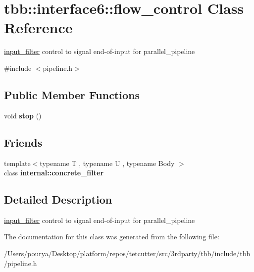 \hypertarget{classtbb_1_1interface6_1_1flow__control}{}\section{tbb\+:\+:interface6\+:\+:flow\+\_\+control Class Reference}
\label{classtbb_1_1interface6_1_1flow__control}


\hyperlink{classinput__filter}{input\+\_\+filter} control to signal end-\/of-\/input for parallel\+\_\+pipeline  




{\ttfamily \#include $<$pipeline.\+h$>$}

\subsection*{Public Member Functions}
\begin{DoxyCompactItemize}
\item 
\hypertarget{classtbb_1_1interface6_1_1flow__control_a21a61b812ca97a6eb5549dab4b4ae490}{}void {\bfseries stop} ()\label{classtbb_1_1interface6_1_1flow__control_a21a61b812ca97a6eb5549dab4b4ae490}

\end{DoxyCompactItemize}
\subsection*{Friends}
\begin{DoxyCompactItemize}
\item 
\hypertarget{classtbb_1_1interface6_1_1flow__control_ae4743f434cefacb6650e3e736daf9392}{}{\footnotesize template$<$typename T , typename U , typename Body $>$ }\\class {\bfseries internal\+::concrete\+\_\+filter}\label{classtbb_1_1interface6_1_1flow__control_ae4743f434cefacb6650e3e736daf9392}

\end{DoxyCompactItemize}


\subsection{Detailed Description}
\hyperlink{classinput__filter}{input\+\_\+filter} control to signal end-\/of-\/input for parallel\+\_\+pipeline 

The documentation for this class was generated from the following file\+:\begin{DoxyCompactItemize}
\item 
/\+Users/pourya/\+Desktop/platform/repos/tetcutter/src/3rdparty/tbb/include/tbb/pipeline.\+h\end{DoxyCompactItemize}
